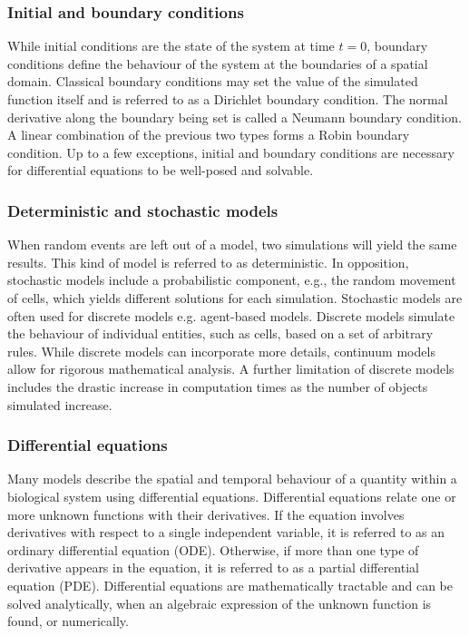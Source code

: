 \documentclass{article}
\begin{document}
\subsubsection{Initial and boundary conditions}
While initial conditions are the state of the system at time $t=0$, boundary conditions define the behaviour of the system at the boundaries of a spatial domain.
Classical boundary conditions may set the value of the simulated function itself and is referred to as a Dirichlet boundary condition. The normal derivative along the boundary being set is called a Neumann boundary condition. A linear combination of the previous two types forms a Robin boundary condition.
Up to a few exceptions, initial and boundary conditions are necessary for differential equations to be well-posed and solvable.

\subsubsection{Deterministic and stochastic models}

When random events are left out of a model, two simulations will yield the same results.
This kind of model is referred to as deterministic.
In opposition, stochastic models include a probabilistic component, e.g., the random movement of cells, which yields different solutions for each simulation.
Stochastic models are often used for discrete models e.g. agent-based models.
Discrete models simulate the behaviour of individual entities, such as cells, based on a set of arbitrary rules.
While discrete models can incorporate more details, continuum models allow for rigorous mathematical analysis.
A further limitation of discrete models includes the drastic increase in computation times as the number of objects simulated increase.

\subsubsection{Differential equations}

Many models describe the spatial and temporal behaviour of a quantity within a biological system using differential equations.
Differential equations relate one or more unknown functions with their derivatives.
If the equation involves derivatives with respect to a single independent variable, it is referred to as an ordinary differential equation (ODE).
Otherwise, if more than one type of derivative appears in the equation, it is referred to as a partial differential equation (PDE).
Differential equations are mathematically tractable and can be solved analytically, when an algebraic expression of the unknown function is found, or numerically.
\end{document}

